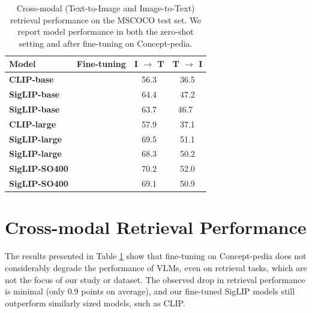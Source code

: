 \documentclass[11pt]{article}
\newcommand{\resource}{Concept-pedia}
\newcommand{\cmark}{\ding{51}} %
\newcommand{\xmark}{\ding{55}}
\begin{document}
\begin{table}[t!]
\centering
    \setlength{\tabcolsep}{4pt}
\begin{tabular}{l c c c}
\toprule
\textbf{Model} & \textbf{Fine-tuning}& \textbf{I $\rightarrow$ T} & \textbf{T $\rightarrow$ I} \\
\midrule
\textbf{CLIP-base} & \xmark  & 56.3             & 36.5       \\ 
\textbf{SigLIP-base}  & \xmark  & 64.4              & 47.2       \\ 
\textbf{SigLIP-base} & \cmark  & 63.7               & 46.7\       \\ 
\midrule
\textbf{CLIP-large} & \xmark & 57.9 & 37.1 \\
\textbf{SigLIP-large }& \xmark & 69.5	& 51.1 \\
\textbf{SigLIP-large} & \cmark	& 68.3	& 50.2 \\
\midrule
\textbf{SigLIP-SO400 }& \xmark & 70.2 & 52.0 \\
\textbf{SigLIP-SO400} & \cmark & 69.1 & 50.9 \\

\bottomrule
\end{tabular}
\caption{Cross-modal (Text-to-Image and Image-to-Text) retrieval performance on the MSCOCO test set. We report model performance in both the zero-shot setting and after fine-tuning on \resource.}
\label{tab:mscoco-retrieval}
\end{table}

\section{Cross-modal Retrieval Performance}
\label{sec:cross-modal}
The results presented in Table \ref{tab:mscoco-retrieval} show that fine-tuning on Concept-pedia does not considerably degrade the performance of VLMs, even on retrieval tasks, which are not the focus of our study or dataset. The observed drop in retrieval performance is minimal (only 0.9 points on average), and our fine-tuned SigLIP models still outperform similarly sized models, such as CLIP.



\end{document}
